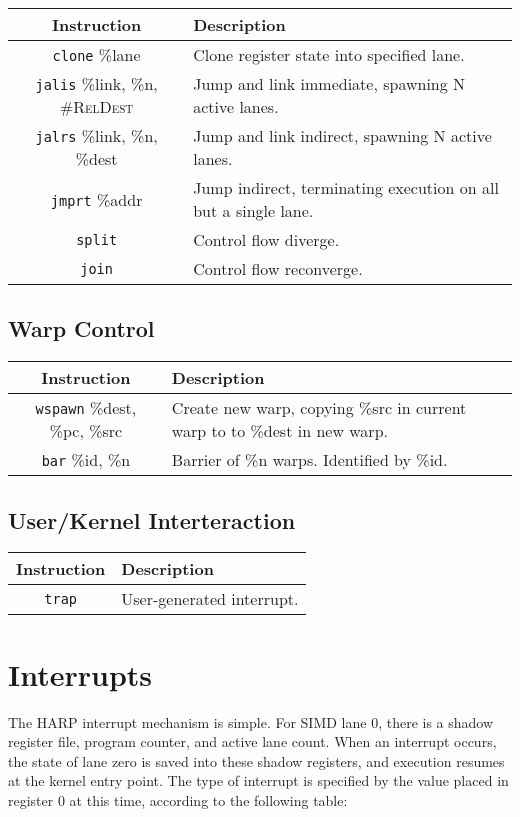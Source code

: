 \documentclass[10pt,letterpaper]{article}
\begin{document}
\begin{center}
\begin{tabular}{cl}
\textbf{Instruction}&\textbf{Description}\\
\hline
\texttt{clone} \%lane&Clone register state into specified lane.\\
\texttt{jalis} \%link, \%n, \textsc{\#RelDest}&Jump and link immediate, spawning N active lanes.\\
\texttt{jalrs} \%link, \%n, \%dest&Jump and link indirect, spawning N active lanes.\\
\texttt{jmprt} \%addr&Jump indirect, terminating execution on all but a single lane.\\
\texttt{split}&Control flow diverge.\\
\texttt{join}&Control flow reconverge.\\
\end{tabular}
\end{center}

\subsection{Warp Control}
\begin{center}
\begin{tabular}{cl}
\textbf{Instruction}&\textbf{Description}\\
\hline
\texttt{wspawn} \%dest, \%pc, \%src&Create new warp, copying \%src in current warp to to \%dest in new warp.\\
\texttt{bar} \%id, \%n&Barrier of \%n warps. Identified by \%id.\\
\end{tabular}
\end{center}

\subsection{User/Kernel Interteraction}

\begin{center}
\begin{tabular}{cl}
\textbf{Instruction}&\textbf{Description}\\
\hline
\texttt{trap}&User-generated interrupt.\\
\end{tabular}
\end{center}

\section{Interrupts}
The HARP interrupt mechanism is simple.
For SIMD lane 0, there is a shadow register file, program counter, and active lane count.
When an interrupt occurs, the state of lane zero is saved into these shadow registers, and execution resumes at the kernel entry point.
The type of interrupt is specified by the value placed in register 0 at this time, according to the following table:
\end{document}
